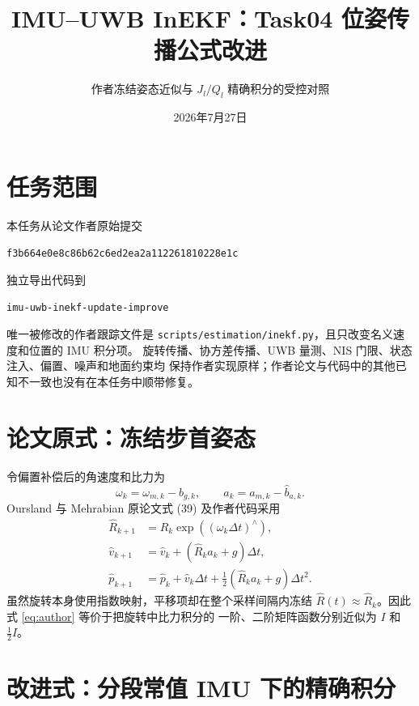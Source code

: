 \documentclass[11pt,a4paper]{ctexart}
\title{IMU--UWB InEKF：Task04 位姿传播公式改进}
\author{作者冻结姿态近似与 $J_l/Q_l$ 精确积分的受控对照}
\date{2026年7月27日}
\begin{document}
\pagestyle{plain}
\maketitle

\section{任务范围}

本任务从论文作者原始提交
\begin{center}
\texttt{f3b664e0e8c86b62c6ed2ea2a112261810228e1c}
\end{center}
独立导出代码到
\begin{center}
\texttt{imu-uwb-inekf-update-improve}
\end{center}
唯一被修改的作者跟踪文件是
\texttt{scripts/estimation/inekf.py}，且只改变名义速度和位置的 IMU 积分项。
旋转传播、协方差传播、UWB 量测、NIS 门限、状态注入、偏置、噪声和地面约束均
保持作者实现原样；作者论文与代码中的其他已知不一致也没有在本任务中顺带修复。

\section{论文原式：冻结步首姿态}

令偏置补偿后的角速度和比力为
\begin{equation}
 \omega_k=\omega_{m,k}-\hat b_{g,k},\qquad
 a_k=a_{m,k}-\hat b_{a,k}.
\end{equation}
Oursland 与 Mehrabian 原论文式 (39) 及作者代码采用
\begin{align}
 \hat R_{k+1}
 &=\hat R_k\exp\!\left((\omega_k\Delta t)^\wedge\right),\\
 \hat v_{k+1}
 &=\hat v_k+\left(\hat R_k a_k+g\right)\Delta t,\\
 \hat p_{k+1}
 &=\hat p_k+\hat v_k\Delta t
 +\frac12\left(\hat R_k a_k+g\right)\Delta t^2.
 \label{eq:author}
\end{align}
虽然旋转本身使用指数映射，平移项却在整个采样间隔内冻结
$\hat R(t)\approx\hat R_k$。因此式 \eqref{eq:author} 等价于把旋转中比力积分的
一阶、二阶矩阵函数分别近似为 $I$ 和 $\tfrac12I$。

\section{改进式：分段常值 IMU 下的精确积分}
\end{document}

